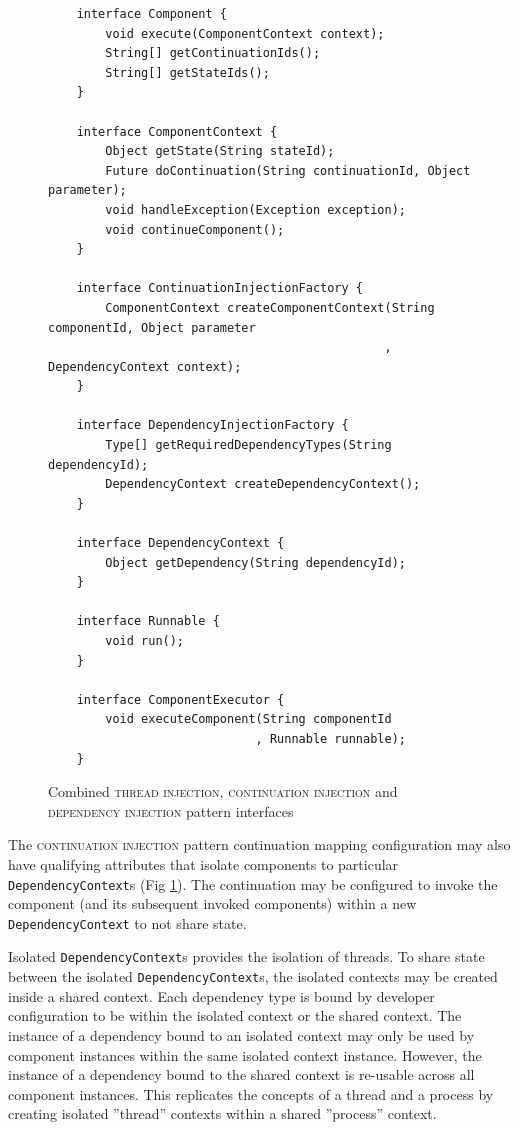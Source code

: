 \documentclass[prodmode]{style/acmlarge}
\begin{document}
\begin{figure}[tp]
\centering
\begin{verbatim}
    interface Component {
        void execute(ComponentContext context);
        String[] getContinuationIds();
        String[] getStateIds();
    }

    interface ComponentContext {
        Object getState(String stateId);
        Future doContinuation(String continuationId, Object parameter);
        void handleException(Exception exception);
        void continueComponent();
    }
    
    interface ContinuationInjectionFactory {
        ComponentContext createComponentContext(String componentId, Object parameter
                                               , DependencyContext context);
    }
    
    interface DependencyInjectionFactory {
        Type[] getRequiredDependencyTypes(String dependencyId);
        DependencyContext createDependencyContext();
    }
    
    interface DependencyContext {
        Object getDependency(String dependencyId);
    }
    
    interface Runnable {
        void run();
    }

    interface ComponentExecutor {
        void executeComponent(String componentId 
                             , Runnable runnable);
    }
\end{verbatim}
\caption{Combined \textsc{thread injection}, \textsc{continuation injection} and \textsc{dependency injection} pattern interfaces\footnotemark}
\label{fig:IocInjectionInterfaces}
\end{figure}


The \textsc{continuation injection} pattern continuation mapping configuration
may also have qualifying attributes that isolate components to particular
\texttt{DependencyContext}s (Fig \ref{fig:IocInjectionInterfaces}).  The
continuation may be configured to invoke the component (and its subsequent
invoked components) within a new \texttt{DependencyContext} to not share state.

Isolated \texttt{DependencyContext}s provides the isolation of threads.  To
share state between the isolated \texttt{Depend\-ency\-Context}s, the isolated
contexts may be created inside a shared context.  Each dependency type is bound
by developer configuration to be within the isolated context or the shared
context.  The instance of a dependency bound to an isolated context may only be
used by component instances within the same isolated context instance.  However,
the instance of a dependency bound to the shared context is re-usable across all
component instances.  This replicates the concepts of a thread and a process by
creating isolated ''thread'' contexts within a shared ''process'' context.
\end{document}
